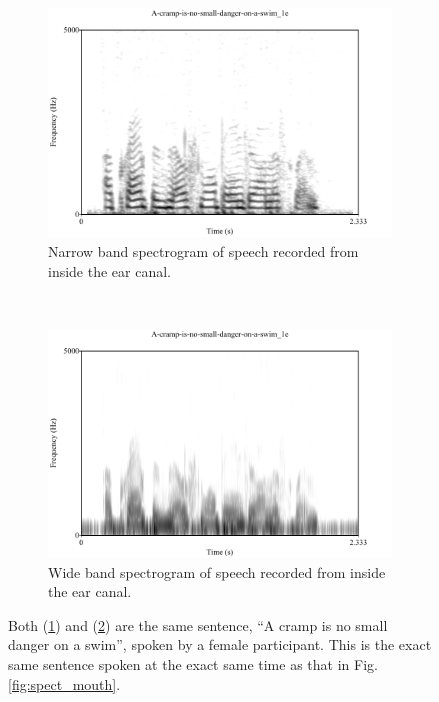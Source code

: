\begin{figure}[H]
\centering
\begin{subfigure}{\textwidth} %
  \centering
  \includegraphics[width=0.75\linewidth]{figure/spctgrmNarrowEar_35.pdf}
  \caption{Narrow band spectrogram of speech recorded from inside the ear canal.}
  \label{spctgrmNarrowEar_35}
\end{subfigure}%
\\[2ex]
\begin{subfigure}{\textwidth}
  \centering
  \includegraphics[width=0.75\linewidth]{figure/spctgrmWideEar_35.pdf}
  \caption{Wide band spectrogram of speech recorded from inside the ear canal.}
  \label{spctgrmWideEar_35}
\end{subfigure}
\caption{Both (\ref{spctgrmNarrowEar_35}) and (\ref{spctgrmWideEar_35}) are the same sentence, ``A cramp is no small danger on a swim'', spoken by a female participant. This is the exact same sentence spoken at the exact same time as that in Fig. \ref{fig:spect_mouth}.}
\label{fig:spect_ear}
\end{figure}


